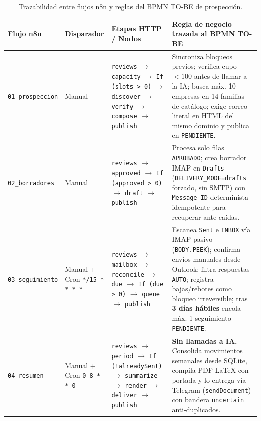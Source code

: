 \documentclass{article}
\begin{document}
\begin{table}[H]
\centering
\small
\renewcommand{\arraystretch}{1.2}
\begin{tabularx}{\textwidth}{p{2.6cm}p{2.0cm}p{4.6cm}L}
\toprule
\textbf{Flujo n8n} & \textbf{Disparador} & \textbf{Etapas HTTP / Nodos} & \textbf{Regla de negocio trazada al BPMN TO-BE} \\
\midrule
\texttt{01\_prospeccion} & Manual & \texttt{reviews} $\rightarrow$ \texttt{capacity} $\rightarrow$ \texttt{If (slots > 0)} $\rightarrow$ \texttt{discover} $\rightarrow$ \texttt{verify} $\rightarrow$ \texttt{compose} $\rightarrow$ \texttt{publish} & Sincroniza bloqueos previos; verifica cupo $< 100$ antes de llamar a la IA; busca máx. 10 empresas en 14 familias de catálogo; exige correo literal en HTML del mismo dominio y publica en \texttt{PENDIENTE}. \\
\addlinespace
\texttt{02\_borradores} & Manual & \texttt{reviews} $\rightarrow$ \texttt{approved} $\rightarrow$ \texttt{If (approved > 0)} $\rightarrow$ \texttt{draft} $\rightarrow$ \texttt{publish} & Procesa solo filas \texttt{APROBADO}; crea borrador IMAP en \texttt{Drafts} (\texttt{DELIVERY\_MODE=drafts} forzado, sin SMTP) con \texttt{Message-ID} determinista idempotente para recuperar ante caídas. \\
\addlinespace
\texttt{03\_seguimiento} & Manual + Cron \texttt{*/15 * * * *} & \texttt{reviews} $\rightarrow$ \texttt{mailbox} $\rightarrow$ \texttt{reconcile} $\rightarrow$ \texttt{due} $\rightarrow$ \texttt{If (due > 0)} $\rightarrow$ \texttt{queue} $\rightarrow$ \texttt{publish} & Escanea \texttt{Sent} e \texttt{INBOX} vía IMAP pasivo (\texttt{BODY.PEEK}); confirma envíos manuales desde Outlook; filtra respuestas \texttt{AUTO}; registra bajas/rebotes como bloqueo irreversible; tras \textbf{3 días hábiles} encola máx. 1 seguimiento \texttt{PENDIENTE}. \\
\addlinespace
\texttt{04\_resumen} & Manual + Cron \texttt{0 8 * * 0} & \texttt{reviews} $\rightarrow$ \texttt{period} $\rightarrow$ \texttt{If (!alreadySent)} $\rightarrow$ \texttt{summarize} $\rightarrow$ \texttt{render} $\rightarrow$ \texttt{deliver} $\rightarrow$ \texttt{publish} & \textbf{Sin llamadas a IA.} Consolida movimientos semanales desde SQLite, compila PDF LaTeX con portada y lo entrega vía Telegram (\texttt{sendDocument}) con bandera \texttt{uncertain} anti-duplicados. \\
\bottomrule
\end{tabularx}
\caption{Trazabilidad entre flujos n8n y reglas del BPMN TO-BE de prospección.}
\end{table}
\end{document}
